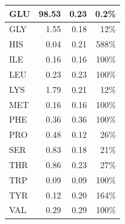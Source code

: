 \documentclass[12pt]{article}
\begin{document}
\begin{table}
\begin{tabular}{lrrr}
        GLU  & 98.53  & 0.23  & 0.2\% \\ \hline
        GLY  & 1.55  & 0.18  & 12\% \\ \hline
        HIS  & 0.04  & 0.21  & 588\% \\ \hline
        ILE  & 0.16  & 0.16  & 100\% \\ \hline
        LEU  & 0.23  & 0.23  & 100\% \\ \hline
        LYS  & 1.79  & 0.21  & 12\% \\ \hline
        MET  & 0.16  & 0.16  & 100\% \\ \hline
        PHE  & 0.36  & 0.36  & 100\% \\ \hline
        PRO  & 0.48  & 0.12  & 26\% \\ \hline
        SER  & 0.83  & 0.18  & 21\% \\ \hline
        THR  & 0.86  & 0.23  & 27\% \\ \hline
        TRP  & 0.09  & 0.09  & 100\% \\ \hline
        TYR  & 0.12  & 0.20  & 164\% \\ \hline
        VAL  & 0.29  & 0.29  & 100\% \\ \bottomrule
    \end{tabular}
\label{tbl:AA_breakdown}
\end{table}

\clearpage

\renewcommand\thefigure{S\arabic{figure}}
\renewcommand\thetable{T\arabic{table}}
\renewcommand\thepage{S-\arabic{page}}
\renewcommand\theequation{S\arabic{equation}}

\setcounter{equation}{0}
\setcounter{table}{0}
\setcounter{figure}{0}
\setcounter{page}{1}

\end{document}
